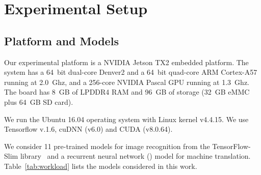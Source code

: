 \section{Experimental Setup \label{sec:setup}}
\subsection{Platform and Models\label{sec:platform}}
 Our experimental platform is a NVIDIA Jetson TX2 embedded platform. The system has a 64~bit dual-core Denver2 and a
64~bit quad-core ARM Cortex-A57 running at 2.0~Ghz, and a 256-core NVIDIA Pascal GPU running at 1.3~Ghz. The board has 8~GB of LPDDR4 RAM
and 96~GB of storage (32~GB eMMC plus 64~GB SD card).


 We run the Ubuntu 16.04 operating system with Linux kernel v4.4.15. We use Tensorflow v.1.6, cuDNN (v6.0) and
CUDA (v8.0.64).


 We consider 11 pre-trained \CNN models for image recognition from the TensorFlow-Slim library~\cite{silberman2013tensorflow} and a recurrent neural network (\RNN) model for machine translation. Table~\ref{tab:workload} lists the
models considered in this work.

